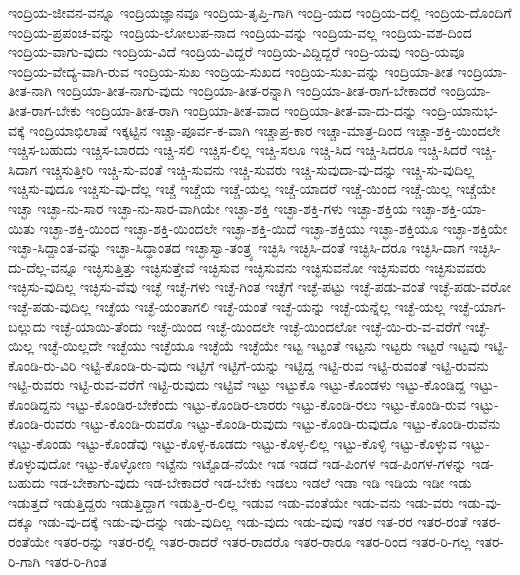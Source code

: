 {ಇಂದ್ರಿಯ-ಜೀವನ-ವನ್ನೂ
ಇಂದ್ರಿಯಜ್ಞಾನವೂ
ಇಂದ್ರಿಯ-ತೃಪ್ತಿ-ಗಾಗಿ
ಇಂದ್ರಿ-ಯದ
ಇಂದ್ರಿಯ-ದಲ್ಲಿ
ಇಂದ್ರಿಯ-ದೊಂದಿಗೆ
ಇಂದ್ರಿಯ-ಪ್ರಪಂಚ-ವನ್ನು
ಇಂದ್ರಿಯ-ಲೋಲುಪ-ನಾದ
ಇಂದ್ರಿಯ-ವನ್ನು
ಇಂದ್ರಿಯ-ವಲ್ಲ
ಇಂದ್ರಿಯ-ವಶ-ದಿಂದ
ಇಂದ್ರಿಯ-ವಾಗು-ವುದು
ಇಂದ್ರಿಯ-ವಿದೆ
ಇಂದ್ರಿಯ-ವಿದ್ದರೆ
ಇಂದ್ರಿಯ-ವಿದ್ದಿದ್ದರೆ
ಇಂದ್ರಿ-ಯವು
ಇಂದ್ರಿ-ಯವೂ
ಇಂದ್ರಿಯ-ವೇದ್ಯ-ವಾಗಿ-ರುವ
ಇಂದ್ರಿಯ-ಸುಖ
ಇಂದ್ರಿಯ-ಸುಖದ
ಇಂದ್ರಿಯ-ಸುಖ-ವನ್ನು
ಇಂದ್ರಿಯಾ-ತೀತ
ಇಂದ್ರಿಯಾ-ತೀತ-ನಾಗಿ
ಇಂದ್ರಿಯಾ-ತೀತ-ನಾಗು-ವುದು
ಇಂದ್ರಿಯಾ-ತೀತ-ರನ್ನಾಗಿ
ಇಂದ್ರಿಯಾ-ತೀತ-ರಾಗ-ಬೇಕಾದರೆ
ಇಂದ್ರಿಯಾ-ತೀತ-ರಾಗ-ಬೇಕು
ಇಂದ್ರಿಯಾ-ತೀತ-ರಾಗಿ
ಇಂದ್ರಿಯಾ-ತೀತ-ವಾದ
ಇಂದ್ರಿಯಾ-ತೀತ-ವಾ-ದು-ದನ್ನು
ಇಂದ್ರಿ-ಯಾನುಭ-ವಕ್ಕೆ
ಇಂದ್ರಿಯಾಭಿಲಾಷೆ
ಇಕ್ಕಟ್ಟಿನ
ಇಚ್ಚಾ-ಪೂರ್ವ-ಕ-ವಾಗಿ
ಇಚ್ಚಾಪ್ರ-ಕಾರ
ಇಚ್ಚಾ-ಮಾತ್ರ-ದಿಂದ
ಇಚ್ಚಾ-ಶಕ್ತಿ-ಯಿಂದಲೇ
ಇಚ್ಚಿಸ-ಬಹುದು
ಇಚ್ಚಿಸ-ಬಾರದು
ಇಚ್ಚಿ-ಸಲಿ
ಇಚ್ಚಿಸ-ಲಿಲ್ಲ
ಇಚ್ಚಿ-ಸಲೂ
ಇಚ್ಚಿ-ಸಿದ
ಇಚ್ಚಿ-ಸಿದರೂ
ಇಚ್ಚಿ-ಸಿದರೆ
ಇಚ್ಚಿ-ಸಿದಾಗ
ಇಚ್ಚಿಸುತ್ತೀರಿ
ಇಚ್ಚಿ-ಸು-ವಂತೆ
ಇಚ್ಚಿ-ಸುವನು
ಇಚ್ಚಿ-ಸುವರು
ಇಚ್ಚಿ-ಸುವುದಾ-ವು-ದನ್ನು
ಇಚ್ಚಿ-ಸು-ವುದಿಲ್ಲ
ಇಚ್ಚಿಸು-ವುದೂ
ಇಚ್ಚಿಸು-ವು-ದೆಲ್ಲ
ಇಚ್ಚೆ
ಇಚ್ಚೆಯ
ಇಚ್ಚೆ-ಯಲ್ಲ
ಇಚ್ಚೆ-ಯಾದರೆ
ಇಚ್ಚೆ-ಯಿಂದ
ಇಚ್ಚೆ-ಯಿಲ್ಲ
ಇಚ್ಚೆಯೇ
ಇಚ್ಛಾ
ಇಚ್ಛಾ-ನು-ಸಾರ
ಇಚ್ಛಾ-ನು-ಸಾರ-ವಾಗಿಯೇ
ಇಚ್ಛಾ-ಶಕ್ತಿ
ಇಚ್ಛಾ-ಶಕ್ತಿ-ಗಳು
ಇಚ್ಛಾ-ಶಕ್ತಿಯ
ಇಚ್ಛಾ-ಶಕ್ತಿ-ಯಾ-ಯಿತು
ಇಚ್ಛಾ-ಶಕ್ತಿ-ಯಿಂದ
ಇಚ್ಛಾ-ಶಕ್ತಿ-ಯಿಂದಲೇ
ಇಚ್ಛಾ-ಶಕ್ತಿ-ಯಿದೆ
ಇಚ್ಛಾ-ಶಕ್ತಿಯು
ಇಚ್ಛಾ-ಶಕ್ತಿಯೂ
ಇಚ್ಛಾ-ಶಕ್ತಿಯೇ
ಇಚ್ಛಾ-ಸಿದ್ದಾಂತ-ವನ್ನು
ಇಚ್ಛಾ-ಸಿದ್ಧಾಂತದ
ಇಚ್ಛಾಸ್ವಾ-ತಂತ್ರ್ಯ
ಇಚ್ಛಿಸಿ
ಇಚ್ಛಿಸಿ-ದಂತೆ
ಇಚ್ಛಿಸಿ-ದರೂ
ಇಚ್ಛಿಸಿ-ದಾಗ
ಇಚ್ಛಿಸಿ-ದು-ದೆಲ್ಲ-ವನ್ನೂ
ಇಚ್ಛಿಸುತ್ತಿತ್ತು
ಇಚ್ಛಿಸುತ್ತೇವೆ
ಇಚ್ಛಿಸುವ
ಇಚ್ಛಿಸುವನು
ಇಚ್ಛಿಸುವನೋ
ಇಚ್ಛಿಸುವರು
ಇಚ್ಛಿಸುವವರು
ಇಚ್ಛಿಸು-ವುದಿಲ್ಲ
ಇಚ್ಛಿಸು-ವೆವು
ಇಚ್ಛೆ
ಇಚ್ಛೆ-ಗಳು
ಇಚ್ಛೆ-ಗಿಂತ
ಇಚ್ಛೆಗೆ
ಇಚ್ಛೆ-ಪಟ್ಟು
ಇಚ್ಛೆ-ಪಡು-ವಂತೆ
ಇಚ್ಛೆ-ಪಡು-ವರೋ
ಇಚ್ಛೆ-ಪಡು-ವುದಿಲ್ಲ
ಇಚ್ಛೆಯ
ಇಚ್ಛೆ-ಯಂತಾಗಲಿ
ಇಚ್ಛೆ-ಯಂತೆ
ಇಚ್ಛೆ-ಯನ್ನು
ಇಚ್ಛೆ-ಯನ್ನೆಲ್ಲ
ಇಚ್ಛೆ-ಯಲ್ಲ
ಇಚ್ಛೆ-ಯಾಗ-ಬಲ್ಲುದು
ಇಚ್ಛೆ-ಯಾಯಿ-ತೆಂದು
ಇಚ್ಛೆ-ಯಿಂದ
ಇಚ್ಛೆ-ಯಿಂದಲೇ
ಇಚ್ಛೆ-ಯಿಂದಲೋ
ಇಚ್ಛೆ-ಯಿ-ರು-ವ-ವರೆಗೆ
ಇಚ್ಛೆ-ಯಿಲ್ಲ
ಇಚ್ಛೆ-ಯಿಲ್ಲದೇ
ಇಚ್ಛೆಯು
ಇಚ್ಛೆಯೂ
ಇಚ್ಛೆಯೆ
ಇಚ್ಛೆಯೇ
ಇಟ್ಟ
ಇಟ್ಟಂತೆ
ಇಟ್ಟನು
ಇಟ್ಟರು
ಇಟ್ಟರೆ
ಇಟ್ಟವು
ಇಟ್ಟಿ-ಕೊಂಡಿ-ರು-ವಿರಿ
ಇಟ್ಟಿ-ಕೊಂಡಿ-ರು-ವುದು
ಇಟ್ಟಿಗೆ
ಇಟ್ಟಿಗೆ-ಯನ್ನು
ಇಟ್ಟಿದ್ದ
ಇಟ್ಟಿ-ರುವ
ಇಟ್ಟಿ-ರುವಂತೆ
ಇಟ್ಟಿ-ರುವನು
ಇಟ್ಟಿ-ರುವರು
ಇಟ್ಟಿ-ರುವ-ವರೆಗೆ
ಇಟ್ಟಿ-ರುವುದು
ಇಟ್ಟಿವೆ
ಇಟ್ಟು
ಇಟ್ಟುಕೊ
ಇಟ್ಟು-ಕೊಂಡಳು
ಇಟ್ಟು-ಕೊಂಡಿದ್ದ
ಇಟ್ಟು-ಕೊಂಡಿದ್ದನು
ಇಟ್ಟು-ಕೊಂಡಿರ-ಬೇಕೆಂದು
ಇಟ್ಟು-ಕೊಂಡಿರ-ಲಾರರು
ಇಟ್ಟು-ಕೊಂಡಿ-ರಲು
ಇಟ್ಟು-ಕೊಂಡಿ-ರುವ
ಇಟ್ಟು-ಕೊಂಡಿ-ರುವರು
ಇಟ್ಟು-ಕೊಂಡಿ-ರುವರೊ
ಇಟ್ಟು-ಕೊಂಡಿ-ರುವುದು
ಇಟ್ಟು-ಕೊಂಡಿ-ರುವುದೊ
ಇಟ್ಟು-ಕೊಂಡಿ-ರುವೆನು
ಇಟ್ಟು-ಕೊಂಡು
ಇಟ್ಟು-ಕೊಂಡೆವು
ಇಟ್ಟು-ಕೊಳ್ಳ-ಕೂಡದು
ಇಟ್ಟು-ಕೊಳ್ಳ-ಲಿಲ್ಲ
ಇಟ್ಟು-ಕೊಳ್ಳಿ
ಇಟ್ಟು-ಕೊಳ್ಳುವ
ಇಟ್ಟು-ಕೊಳ್ಳುವುದೋ
ಇಟ್ಟು-ಕೊಳ್ಳೋಣ
ಇಟ್ಟೆನು
ಇಟ್ಟೊಡ-ನೆಯೇ
ಇಡ
ಇಡದೆ
ಇಡ-ಪಿಂಗಳ
ಇಡ-ಪಿಂಗಳ-ಗಳನ್ನು
ಇಡ-ಬಹುದು
ಇಡ-ಬೇಕಾಗು-ವುದು
ಇಡ-ಬೇಕಾದರೆ
ಇಡ-ಬೇಕು
ಇಡಲು
ಇಡಲೆ
ಇಡಾ
ಇಡಿ
ಇಡಿಯ
ಇಡೀ
ಇಡು
ಇಡುತ್ತದೆ
ಇಡುತ್ತಿದ್ದರು
ಇಡುತ್ತಿದ್ದಾಗ
ಇಡುತ್ತಿ-ರ-ಲಿಲ್ಲ
ಇಡುವ
ಇಡು-ವಂತೆಯೇ
ಇಡು-ವನು
ಇಡು-ವರು
ಇಡು-ವು-ದಕ್ಕೂ
ಇಡು-ವು-ದಕ್ಕೆ
ಇಡು-ವು-ದನ್ನು
ಇಡು-ವುದಿಲ್ಲ
ಇಡು-ವುದು
ಇಡು-ವುವು
ಇತರ
ಇತ-ರರ
ಇತರ-ರಂತೆ
ಇತರ-ರಂತೆಯೇ
ಇತರ-ರನ್ನು
ಇತರ-ರಲ್ಲಿ
ಇತರ-ರಾದರೆ
ಇತರ-ರಾದರೊ
ಇತರ-ರಾರೂ
ಇತರ-ರಿಂದ
ಇತರ-ರಿ-ಗಲ್ಲ
ಇತರ-ರಿ-ಗಾಗಿ
ಇತರ-ರಿ-ಗಿಂತ
}
